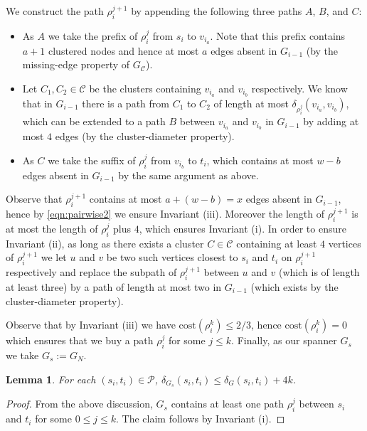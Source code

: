 \documentclass[a4paper,11pt]{article}
\newtheorem{lemma}{Lemma}[section]
\theoremstyle{definition}
\newcommand{\dist}{\delta}
\newcommand{\cost}{\mathrm{cost}}
\newcommand{\cP}{\mathcal{P}}
\newcommand{\cC}{\mathcal{C}}
\begin{document}
We construct the path $\rho_i^{j+1}$ by appending the following three
paths $A$, $B$, and $C$:
\begin{itemize}
  \item As $A$ we take the prefix of $\rho_i^j$ from $s_i$ to $v_{i_a}$.
  Note that this prefix contains $a+1$ clustered nodes and hence at most $a$ edges absent 
  in $G_{i-1}$ (by the missing-edge property of $G_{\cC}$).
  \item Let $C_1, C_2 \in \cC$ be the clusters containing $v_{i_a}$ and $v_{i_b}$ respectively.
  We know that in $G_{i-1}$ there is a path from $C_1$ to $C_2$ of length at most $\dist_{\rho_i^j}(v_{i_a},v_{i_b})$,
  which can be extended to a path $B$ between $v_{i_a}$ and $v_{i_b}$ in $G_{i-1}$ by adding at most $4$ edges
  (by the cluster-diameter property).
  \item As $C$ we take the suffix of $\rho_i^j$ from $v_{i_b}$ to $t_i$,
  which contains at most $w-b$ edges absent in $G_{i-1}$ by the same argument as above.
\end{itemize}
Observe that $\rho_i^{j+1}$ contains at most $a+(w-b)=x$ edges absent in $G_{i-1}$, hence by \eqref{eqn:pairwise2} we ensure Invariant (iii).
Moreover the length of $\rho_i^{j+1}$ is at most the length of $\rho_i^j$ plus $4$, which ensures Invariant (i).
In order to ensure Invariant (ii), as long as there exists a cluster $C \in \cC$
containing at least $4$ vertices of $\rho_i^{j+1}$ we let
$u$ and $v$ be two such vertices closest to $s_i$ and $t_i$ on $\rho_i^{j+1}$ respectively
and replace the subpath of $\rho_i^{j+1}$ between $u$ and $v$ (which is of length at least three)
by a path of length at most two in $G_{i-1}$ (which exists by  the cluster-diameter property).

Observe that by Invariant (iii) we have $\cost(\rho_i^k) \le 2/3$, hence $\cost(\rho_i^k) = 0$ which ensures that we buy a path $\rho_i^j$ for some $j \le k$. Finally, as our spanner $G_s$ we take $G_s := G_N$.




\begin{lemma}\label{lem:stretchPairwise2}
For each $(s_i,t_i)\in \cP$, $\dist_{G_s}(s_i,t_i)\leq \dist_G(s_i,t_i)+4k$.
\end{lemma}
\begin{proof}
From the above discussion, $G_s$ contains at least one path $\rho^j_i$ between $s_i$ and $t_i$ for some $0\leq j\leq k$. The claim follows by Invariant (i). 
\end{proof}
\end{document}
